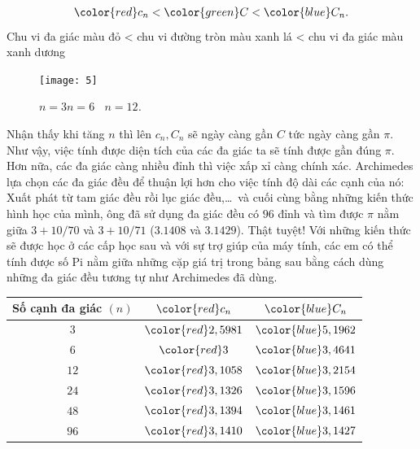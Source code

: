 \begin{multicols}{2}
	\begin{align*}
		{\color{red}c_n} < {\color{green}C} < {\color{blue}C_n}.
	\end{align*}
	Chu vi đa giác màu đỏ < chu vi đường tròn màu xanh lá < chu vi đa giác màu xanh dương
	\begin{figure}[H]
		\vspace*{-5pt}
		\centering
		\captionsetup{labelformat= empty, justification=centering}
		\texttt{[image: 5]}
		\caption{\small\textit{\color{toancuabi}\hfill$n=3$\hfill\quad $n= 6$ \quad\quad\, $n= 12$.\quad}}
		\vspace*{-10pt}
	\end{figure}
	Nhận thấy khi tăng $n$ thì lên $c_n,C_n$ sẽ ngày càng gần $C$ tức ngày càng gần $\pi$.  Như vậy, việc tính được diện tích của các đa giác ta sẽ tính được gần đúng $\pi$. Hơn nữa, các đa giác càng nhiều đỉnh thì việc xấp xỉ càng chính xác. Archimedes lựa chọn các đa giác đều để thuận lợi hơn cho việc tính độ dài các cạnh của nó: Xuất phát từ tam giác đều rồi lục giác đều,\ldots\, và cuối cùng bằng những kiến thức hình học của mình, ông đã sử dụng đa giác đều có $96$ đỉnh và tìm được $\pi$ nằm giữa $3+ 10/70$ và $3+10/71$ ($3{.}1408$ và $3{.}1429$). Thật tuyệt!
	\vskip 0.1cm
	Với những kiến thức sẽ được học ở các cấp học sau và với sự trợ giúp của máy tính, các em có thể tính được số Pi nằm giữa những cặp giá trị trong bảng sau bằng cách dùng những đa giác đều tương tự như Archimedes đã dùng.
	\begin{table}[H]
		\vspace*{-5pt}
		\setlength{\tabcolsep}{7pt}
		\renewcommand{\arraystretch}{1.3}
		\begin{tabular}{|c|c|c|}
			\hline
			Số cạnh đa giác $(n)$ & $\color{red}c_n$ & $\color{blue}C_n$\\
			\hline
			$3$ &	$\color{red}2,5981$&	$\color{blue}5,1962$\\
			\hline
			$6$&	$\color{red}3$&	$\color{blue}3,4641$\\
			\hline
			$12$&	$\color{red}3,1058$&	$\color{blue}3,2154$\\
			\hline
			$24$& $\color{red}3,1326$&	$\color{blue}3,1596$\\
			\hline
			$48$&	$\color{red}3,1394$&	$\color{blue}3,1461$\\
			\hline
			$96$&	$\color{red}3,1410$&	$\color{blue}3,1427$\\
			\hline
		\end{tabular}
		\vspace*{-10pt}
	\end{table}

\end{multicols}
